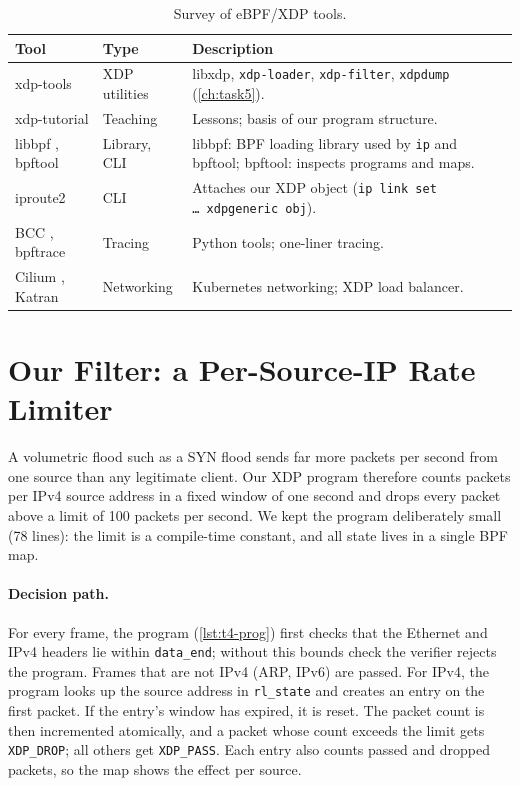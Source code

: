 \begin{table}[htbp]
	\centering\footnotesize
	\caption{Survey of eBPF/XDP tools.}\label{tab:t4-tools}
	\begin{tabularx}{\linewidth}{>{\raggedright\arraybackslash}p{4.3cm}>{\raggedright\arraybackslash}p{2.2cm}X}
		\toprule
		Tool & Type & Description \\
		\midrule
		xdp-tools \autocite{xdptools_github} & XDP utilities & libxdp, \texttt{xdp-loader}, \texttt{xdp-filter}, \texttt{xdpdump} (\cref{ch:task5}). \\
		xdp-tutorial \autocite{xdp_tutorial} & Teaching & Lessons; basis of our program structure. \\
		libbpf \autocite{libbpf_github}, bpftool \autocite{kdoc_bpf} & Library, CLI & libbpf: BPF loading library used by \texttt{ip} and bpftool; bpftool: inspects programs and maps. \\
		iproute2 & CLI & Attaches our XDP object (\texttt{ip link set \dots\ xdpgeneric obj}). \\
		BCC \autocite{bcc_github}, bpftrace \autocite{bpftrace_github} & Tracing & Python tools; one-liner tracing. \\
		Cilium \autocite{cilium_kpr}, Katran \autocite{katran_github} & Networking & Kubernetes networking; XDP load balancer. \\
		\bottomrule
	\end{tabularx}
\end{table}

\section{Our Filter: a Per-Source-IP Rate Limiter}\label{sec:t4-design}
A volumetric flood such as a SYN flood sends far more packets per second from one source than any legitimate client. Our XDP program therefore counts packets per IPv4 source address in a fixed window of one second and drops every packet above a limit of 100 packets per second. We kept the program deliberately small (78 lines): the limit is a compile-time constant, and all state lives in a single BPF map.

\paragraph{Decision path.} For every frame, the program (\cref{lst:t4-prog}) first checks that the Ethernet and IPv4 headers lie within \texttt{data\_end}; without this bounds check the verifier rejects the program. Frames that are not IPv4 (ARP, IPv6) are passed. For IPv4, the program looks up the source address in \texttt{rl\_state} and creates an entry on the first packet. If the entry's window has expired, it is reset. The packet count is then incremented atomically, and a packet whose count exceeds the limit gets \texttt{XDP\_DROP}; all others get \texttt{XDP\_PASS}. Each entry also counts passed and dropped packets, so the map shows the effect per source.

